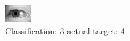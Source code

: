 \begin{figure}[h!]
\begin{center}
\includegraphics[width=0.60\columnwidth]{figures/ID3233_class_3_target_4.png}
\end{center}
\caption{ Classification: 3 actual target: 4}
\label{fig:ID3233_class_3_target_4}
\end{figure}
